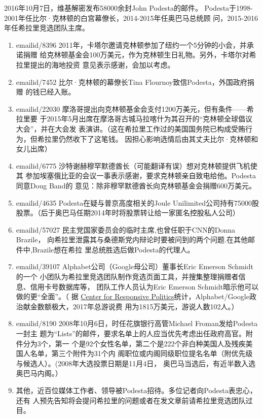 2016年10月7日，维基解密发布58000余封John Podesta的邮件。
Podesta于1998-2001年任比尔·克林顿的白宫幕僚长，2014-2015年任奥巴马总统顾
问，2015-2016年任希拉里竞选团队主席。
\begin{enumerate}
\item emailid/8396 2011年，卡塔尔邀请克林顿参加了纽约一个5分钟的小会，并承诺捐赠
给克林顿基金会100万美元，作为克林顿生日礼物。另外，卡塔尔对希拉里提出的海地投资
意见表示感谢，会加以考虑。

  \item emailid/7452 比尔·克林顿的幕僚长Tina Flournoy致信Podesta，外国政府捐赠
的钱已经入账。

  \item emailid/22030 摩洛哥提出向克林顿基金会支付1200万美元，但有条件——希拉里要
于2015年5月出席在摩洛哥古城马拉喀什为其召开的“克林顿全球倡议大会”，并在大会发
表演讲。（这在希拉里工作过的美国国务院已构成受贿行为，但希拉里仍然收下了这笔钱。
因担心影响选情后由其丈夫比尔·克林顿和女儿出席）

  \item emailid/6775 沙特谢赫穆罕默德酋长（可能翻译有误）想对克林顿提供飞机使其
参加埃塞俄比亚的会议一事表示感谢，要求克林顿亲自致电给他。Podesta同意Doug Band的
意见：除非穆罕默德酋长向克林顿基金会捐赠600万美元。

  \item emailid/4635 Podesta在疑与普京高度相关的Joule Unilimited公司持有75000股
股票。（后于奥巴马任期2014年时将股票转让给一家匿名控股私人公司）

  \item emailid/57027 民主党国家委员会的临时主席,也曾任职于CNN的Donna Brazile，
向希拉里泄露其与桑德斯党内辩论时要被问到的两个问题.在其他邮件中,Brazile想在希拉
里总统胜选后做Podesta的代理人。

\item emailid/39107 Alphabet公司（Google母公司）董事长Eric Emerson Schmidt的一个
  小团队为希拉里竞选团队制作竞选页面工具，并搜集整理捐赠者信息、信用卡号数据库等，
  团队工作人员认为Eric Emerson Schmidt暗示他可以做的更“全面”。（
  据
  \href{https://www.opensecrets.org/lobby/clientsum.php?id=D000067823&year=2017}{Center
    for Responsive Politics}统计，Alphabet/Google政治献金数额极大，2017年总游说费
  用为1815万美元，游说人数102人。）

\item emailid/8190 2008年10月6日，时任花旗银行高管Michael Froman发给Podesta一封主
  题为“Lists”的邮件，要求名单上的人应当优先考虑出任政府高官。附件分为3个，第一
  个是92个女性名单，第二个是222个非白种美国人及残疾美国人名单，第三个附件为31个内
  阁职位或内阁同级职位提名名单（附优先级与候选人）。(2008年大选投票日期是11月4日，
  奥巴马当选后，有近半数入选奥巴马内阁。）

  \item 其他，近百位媒体工作者、领导被Podesta招待。多位记者向Podesta表忠心，还有
    人预先告知将会提问希拉里的问题或者在发文章前请希拉里竞选团队过目。
\end{enumerate}


